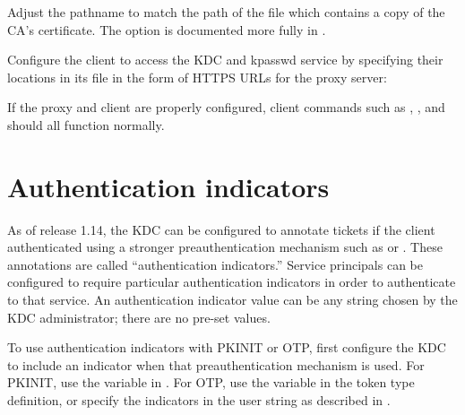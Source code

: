\documentclass[letterpaper,10pt,english]{sphinxmanual}
\begin{document}
Adjust the pathname to match the path of the file which contains a
copy of the CA’s certificate.  The  option is documented
more fully in {\hyperref[\detokenize{admin/conf_files/krb5_conf:krb5-conf-5}]{}}.

Configure the client to access the KDC and kpasswd service by
specifying their locations in its {\hyperref[\detokenize{admin/conf_files/krb5_conf:krb5-conf-5}]{}} file in the form
of HTTPS URLs for the proxy server:

%
\begin{sphinxVerbatim}[commandchars=\\\{\}]
  
  
\end{sphinxVerbatim}

If the proxy and client are properly configured, client commands such
as , , and  should all function normally.


\chapter{Authentication indicators}
\label{\detokenize{admin/auth_indicator:auth-indicator}}\label{\detokenize{admin/auth_indicator:authentication-indicators}}\label{\detokenize{admin/auth_indicator::doc}}
As of release 1.14, the KDC can be configured to annotate tickets if
the client authenticated using a stronger preauthentication mechanism
such as {\hyperref[\detokenize{admin/pkinit:pkinit}]{}} or {\hyperref[\detokenize{admin/otp:otp-preauth}]{}}.  These
annotations are called “authentication indicators.”  Service
principals can be configured to require particular authentication
indicators in order to authenticate to that service.  An
authentication indicator value can be any string chosen by the KDC
administrator; there are no pre-set values.

To use authentication indicators with PKINIT or OTP, first configure
the KDC to include an indicator when that preauthentication mechanism
is used.  For PKINIT, use the  variable in
{\hyperref[\detokenize{admin/conf_files/kdc_conf:kdc-conf-5}]{}}.  For OTP, use the  variable in the
token type definition, or specify the indicators in the  user
string as described in {\hyperref[\detokenize{admin/otp:otp-preauth}]{}}.
\end{document}
